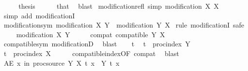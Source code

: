 \begin{isabellebody}
\ \ \isamarkupfalse%
\ \isamarkupfalse%
\ {\isacharquery}{\kern0pt}thesis\isanewline
\ \ \ \ \isamarkupfalse%
\ that\ \isamarkupfalse%
\ blast\isanewline
{}\isamarkupfalse%
%
\endisatagproof
{\isafoldproof}%
%
\isadelimproof
\isanewline
%
\endisadelimproof
\isanewline
{}\isamarkupfalse%
\ modification{\isacharunderscore}{\kern0pt}refl\ {\isacharbrackleft}{\kern0pt}simp{\isacharbrackright}{\kern0pt}{\isacharcolon}{\kern0pt}\ {\isachardoublequoteopen}modification\ X\ X{\isachardoublequoteclose}\isanewline
%
\isadelimproof
\ \ %
\endisadelimproof
%
\isatagproof
{}\isamarkupfalse%
\ {\isacharparenleft}{\kern0pt}simp\ add{\isacharcolon}{\kern0pt}\ modificationI{\isacharparenright}{\kern0pt}%
\endisatagproof
{\isafoldproof}%
%
\isadelimproof
\isanewline
%
\endisadelimproof
\isanewline
{}\isamarkupfalse%
\ modification{\isacharunderscore}{\kern0pt}sym{\isacharcolon}{\kern0pt}\ {\isachardoublequoteopen}modification\ X\ Y\ {\isasymLongrightarrow}\ modification\ Y\ X{\isachardoublequoteclose}\isanewline
%
\isadelimproof
%
\endisadelimproof
%
\isatagproof
{}\isamarkupfalse%
\ {\isacharparenleft}{\kern0pt}rule\ modificationI{\isacharcomma}{\kern0pt}\ safe{\isacharparenright}{\kern0pt}\isanewline
\ \ \isamarkupfalse%
\ {\isacharasterisk}{\kern0pt}{\isacharcolon}{\kern0pt}\ {\isachardoublequoteopen}modification\ X\ Y{\isachardoublequoteclose}\isanewline
\ \ \isamarkupfalse%
\ \isamarkupfalse%
\ compat{\isacharcolon}{\kern0pt}\ {\isachardoublequoteopen}compatible\ Y\ X{\isachardoublequoteclose}\isanewline
\ \ \ \ \isamarkupfalse%
\ compatible{\isacharunderscore}{\kern0pt}sym\ modificationD{\isacharparenleft}{\kern0pt}{}{\isacharparenright}{\kern0pt}\ \isamarkupfalse%
\ blast\isanewline
\ \ \isamarkupfalse%
\ t\ \isamarkupfalse%
\ {\isachardoublequoteopen}t\ {\isasymin}\ proc{\isacharunderscore}{\kern0pt}index\ Y{\isachardoublequoteclose}\isanewline
\ \ \isamarkupfalse%
\ \isamarkupfalse%
\ {\isachardoublequoteopen}t\ {\isasymin}\ proc{\isacharunderscore}{\kern0pt}index\ X{\isachardoublequoteclose}\isanewline
\ \ \ \ \isamarkupfalse%
\ compatible{\isacharunderscore}{\kern0pt}index{\isacharbrackleft}{\kern0pt}OF\ compat{\isacharbrackright}{\kern0pt}\ \isamarkupfalse%
\ blast\isanewline
\ \ \isamarkupfalse%
\ {\isachardoublequoteopen}AE\ x\ in\ proc{\isacharunderscore}{\kern0pt}source\ Y{\isachardot}{\kern0pt}\ X\ t\ x\ {\isacharequal}{\kern0pt}\ Y\ t\ x{\isachardoublequoteclose}\isanewline

\end{isabellebody}
